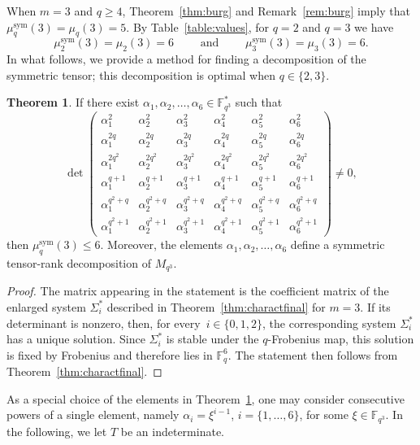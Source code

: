 \documentclass[11pt,a4paper,reqno]{article}
\numberwithin{equation}{section}
\theoremstyle{definition}
\newtheorem{theorem}{Theorem}[section]
\newcommand{\numberset}{\mathbb}
\newcommand{\F}{\numberset{F}}
\begin{document}
When \(m=3\) and \(q\ge 4\), Theorem~\ref{thm:burg} and Remark~\ref{rem:burg} imply that $\mu_q^{\mathrm{sym}}(3)=\mu_q(3)=5$. By Table~\ref{table:values}, for \(q=2\) and \(q=3\) we have
\[
\mu_2^{\mathrm{sym}}(3)=\mu_2(3)=6
\qquad\text{ and }\qquad
\mu_3^{\mathrm{sym}}(3)=\mu_3(3)=6.
\]
In what follows, we provide a method for finding a decomposition of the symmetric tensor; this decomposition is optimal when \(q\in\{2,3\}\).


\begin{theorem}\label{thm:m=3}
    If there exist $\alpha_1,\alpha_2,\ldots,\alpha_6 \in \F_{q^3}^*$ such that
    \[\det
    \begin{pmatrix}
        \alpha_1^2 & \alpha_2^2 & \alpha_3^2 & \alpha_4^2 & \alpha_5^2 & \alpha_6^2\\
        \alpha_1^{2q} & \alpha_2^{2q} & \alpha_3^{2q} & \alpha_4^{2q} & \alpha_5^{2q} & \alpha_6^{2q}\\
        \alpha_1^{2q^2} & \alpha_2^{2q^2} & \alpha_3^{2q^2} & \alpha_4^{2q^2} & \alpha_5^{2q^2} & \alpha_6^{2q^2}\\
        \alpha_1^{q+1} & \alpha_2^{q+1} & \alpha_3^{q+1} & \alpha_4^{q+1} & \alpha_5^{q+1} & \alpha_6^{q+1}\\
        \alpha_1^{q^2+q} & \alpha_2^{q^2+q} & \alpha_3^{q^2+q} & \alpha_4^{q^2+q} & \alpha_5^{q^2+q} & \alpha_6^{q^2+q}\\
        \alpha_1^{q^2+1} & \alpha_2^{q^2+1} & \alpha_3^{q^2+1} & \alpha_4^{q^2+1} & \alpha_5^{q^2+1} & \alpha_6^{q^2+1}
    \end{pmatrix} \ne 0,
    \]
    then \(\mu_q^{\mathrm{sym}}(3)\le 6\). Moreover, the elements \(\alpha_1,\alpha_2,\ldots,\alpha_6\) define a symmetric tensor-rank decomposition of
\(M_{q^3}\).
\end{theorem}
\begin{proof}
The matrix appearing in the statement is the coefficient matrix of the
enlarged system \(\Sigma_i^*\) described in Theorem~\ref{thm:charactfinal}
for \(m=3\). If its determinant is nonzero, then, for every~\(i\in\{0,1,2\}\), the
corresponding system \(\Sigma_i^*\) has a unique solution. Since
\(\Sigma_i^*\) is stable under the \(q\)-Frobenius map, this solution is
fixed by Frobenius and therefore lies in \(\mathbb F_q^6\). The statement
then follows from Theorem~\ref{thm:charactfinal}.
\end{proof}

As a special choice of the elements in Theorem~\ref{thm:m=3}, one may
consider consecutive powers of a single element, namely $\alpha_i=\xi^{i-1}$,  $i=\{1,\ldots,6\}$, for some \(\xi\in \mathbb F_{q^3}\). In the following, we let $T$ be an indeterminate.
\end{document}
